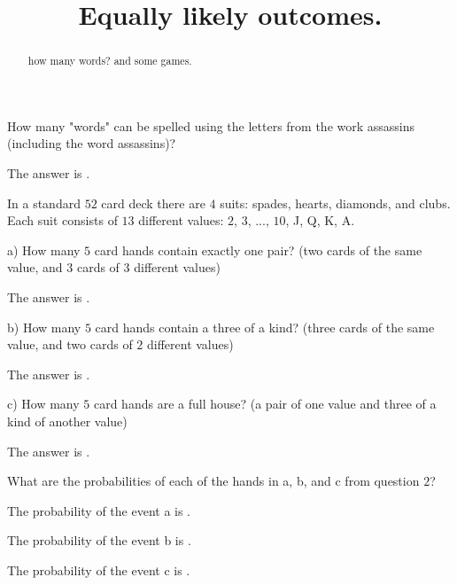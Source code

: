 \documentclass{ximera}
\title{Equally likely outcomes.}
\begin{document}
\begin{abstract}
how many words? and some games.
\end{abstract}
\maketitle

\begin{question}
How many "words" can be spelled using the letters from the work assassins (including the word assassins)?
     \begin{solution}
           The answer is .
     \end{solution}
\end{question}

\begin{question}
In a standard $52$ card deck there are $4$ suits:  spades, hearts, diamonds, and clubs.  Each suit consists of $13$ different values:  $2$, $3$, ..., $10$, J, Q, K, A. 

a)  How many $5$ card hands contain exactly one pair?  (two cards of the same value, and $3$ cards of $3$ different values)
     \begin{solution}
           The answer is .
     \end{solution}
     
b)  How many $5$ card hands contain a three of a kind?  (three cards of the same value, and two cards of $2$ different values)
     \begin{solution}
           The answer is .
     \end{solution}
     
c)  How many $5$ card hands are a full house?  (a pair of one value and three of a kind of another value)
     \begin{solution}
           The answer is .
     \end{solution}
\end{question}

\begin{question}
What are the probabilities of each of the hands in a, b, and c from question $2$?
     \begin{solution}
           The probability of the event a is .
     \end{solution}
      \begin{solution}
           The probability of the event b is .
     \end{solution}
      \begin{solution}
           The probability of the event c is .
     \end{solution}
\end{question}
\end{document}
